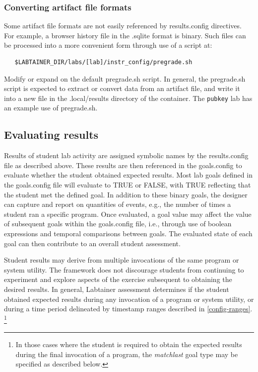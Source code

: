 \documentclass[12pt]{article}
\begin{document}
\subsubsection{Converting artifact file formats}
Some artifact file formats are not easily referenced by results.config directives.
For example, a browser history file in the .sqlite format is binary.  Such files
can be processed into a more convenient form through use of a script at:
\begin{verbatim}
   $LABTAINER_DIR/labs/[lab]/instr_config/pregrade.sh
\end{verbatim}
\noindent Modify or expand on the default pregrade.sh script.
In general, the pregrade.sh script is expected to extract or convert
data from an artifact file, and write it into a new file in the .local/results
directory of the container.  The {\tt pubkey} lab has an example use of pregrade.sh. 

\subsection{Evaluating results}
\label{goals.config}
Results of student lab activity are assigned symbolic names by the results.config file
as described above.  These results are then referenced in the goals.config to evaluate whether
the student obtained expected results.  Most lab goals defined in the goals.config file
will evaluate to TRUE or FALSE, with TRUE reflecting that the student met the defined goal.
In addition to these binary goals, the designer can capture and report on quantities of events,
e.g., the number of times a student ran a specific program.
Once evaluated, a goal value may affect the value of subsequent goals within the goals.config file, 
i.e., through use of boolean expressions and temporal comparisons between goals.  The evaluated
state of each goal can then contribute to an overall student assessment.

Student results may derive from multiple invocations of the same program or system utility.  
The framework does not discourage students from continuing to experiment and explore aspects of the 
exercise subsequent to obtaining the desired results.  In general, Labtainer assessment determines if the student
obtained expected results during any invocation of a program or system utility, or during a time period
delineated by timestamp ranges described in \ref{config-ranges}.  \footnote{In those cases 
where the student is required to obtain the expected results during the final invocation of a program, 
the \textit{matchlast} goal type may be specified as described below.}
\end{document}
